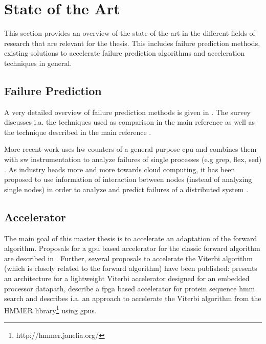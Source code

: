 \documentclass[mscthesis]{usiinfthesis}
\begin{document}
\chapter{State of the Art}
\label{ch:art}
\glsresetall %

This section provides an overview of the state of the art in the different
fields of research that are relevant for the thesis. This includes failure
prediction methods, existing solutions to accelerate failure prediction
algorithms and acceleration techniques in general.

\section{Failure Prediction}
\label{ch:art_pred}
A very detailed overview of failure prediction methods is given in
\cite{ACM10_Salfner}. The survey discusses i.a. the techniques used as
comparison in the main reference
\cite{lin88,IEEE90_lin,ICDM02_Vilalta,domeniconi02} as well as the technique
described in the main reference \cite{salfner08}.

More recent work uses \gls{hw} counters of a general purpose \gls{cpu} and
combines them with \gls{sw} instrumentation to analyze failures of single
processes (e.g grep, flex, sed) \cite{FSE10_Yilmaz}. As industry heads more and
more towards cloud computing, it has been proposed to use information of
interaction between nodes (instead of analyzing single nodes) in order to
analyze and predict failures of a distributed system
\cite{IEEE12_Salfner,DSN10_Oliner}.

\section{Accelerator}
\label{ch:art_acc}

The main goal of this master thesis is to accelerate an adaptation of the
forward algorithm. Proposals for a \gls{gpu} based accelerator for the classic
forward algorithm are described in \cite{neumann11,liu09}. Further, several
proposals to accelerate the Viterbi algorithm (which is closely related to the
forward algorithm) have been published: \cite{ASAP12_Azhar} presents an
architecture for a lightweight Viterbi accelerator designed for an embedded
processor datapath, \cite{IPDPS07_Jacob,ICS06_Maddimsetty,IPDPS07_Oliver}
describe a \gls{fpga} based accelerator for protein sequence \gls{hmm} search
and \cite{IPDPS09_Walters} describes i.a. an approach to accelerate the Viterbi
algorithm from the HMMER library\footnote{http://hmmer.janelia.org/} using
\glspl{gpu}.
\end{document}
